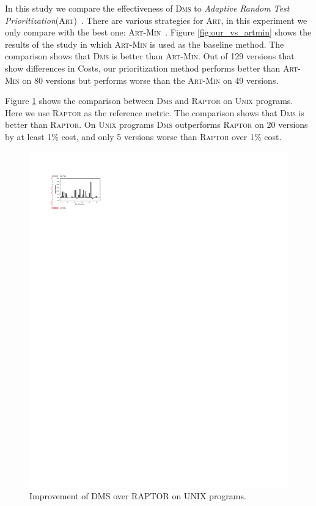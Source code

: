 \vspace{0.2cm}
 In this study we compare the effectiveness of \textsc{Dms} to {\em Adaptive Random Test Prioritization}(\textsc{Art})~\citep{JiangZCT09}.
There are various strategies for \textsc{Art}, in this experiment we only compare with the best one: \textsc{Art-Min}~\citep{JiangZCT09, Gonzalez-SanchezPAGG11, Alberto2011}.
Figure \ref{fig:our_vs_artmin} shows the results of the study in which \textsc{Art-Min} is used
as the baseline method. The comparison shows that \textsc{Dms} is better than \textsc{Art-Min}.
Out of 129 versions that show differences in Costs, our prioritization method performs
better than \textsc{Art-Min} on 80 versions but performs worse than the
\textsc{Art-Min} on 49 versions.

\vspace{0.2cm}
Figure \ref{fig:our_vs_ag_unix} shows the comparison between \textsc{Dms} and \textsc{Raptor} on \textsc{Unix} programs.
Here we use \textsc{Raptor} as the reference metric. The comparison shows that \textsc{Dms} is better than \textsc{Raptor}.
On \textsc{Unix} programs \textsc{Dms} outperforms \textsc{Raptor} on 20 versions by at least 1\% cost,
and only 5 versions worse than \textsc{Raptor} over 1\% cost.

\begin{figure}[!htbp]
    \centering
    \includegraphics[width=12cm]{our_vs_ag_unix.pdf}
    \caption{Improvement of D{\scriptsize MS} over R{\scriptsize APTOR} on U{\scriptsize NIX} programs.}
    \label{fig:our_vs_ag_unix}
\end{figure}

